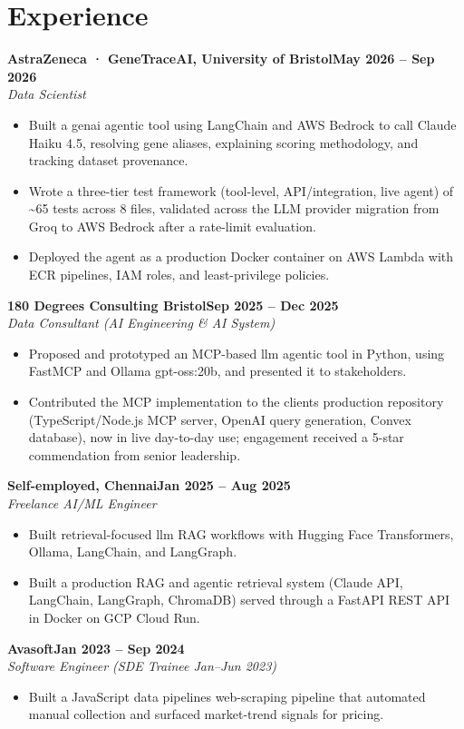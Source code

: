 \documentclass[a4paper,10pt]{article}
\newcommand{\entry}[4]{\noindent\textbf{#1}\hfill\textbf{#2}\\ \textit{#3}\hfill\textit{#4}\par}
\begin{document}
\section{Experience}
\entry{AstraZeneca · GeneTraceAI, University of Bristol}{May 2026 – Sep 2026}{Data Scientist}{}
\begin{itemize}
  \item Built a genai agentic tool using LangChain and AWS Bedrock to call Claude Haiku 4.5, resolving gene aliases, explaining scoring methodology, and tracking dataset provenance.
  \item Wrote a three-tier test framework (tool-level, API/integration, live agent) of \textasciitilde{}65 tests across 8 files, validated across the LLM provider migration from Groq to AWS Bedrock after a rate-limit evaluation.
  \item Deployed the agent as a production Docker container on AWS Lambda with ECR pipelines, IAM roles, and least-privilege policies.
\end{itemize}
\vspace{3pt}
\entry{180 Degrees Consulting Bristol}{Sep 2025 – Dec 2025}{Data Consultant (AI Engineering \& AI System)}{}
\begin{itemize}
  \item Proposed and prototyped an MCP-based llm agentic tool in Python, using FastMCP and Ollama gpt-oss:20b, and presented it to stakeholders.
  \item Contributed the MCP implementation to the client\textquotesingle{}s production repository (TypeScript/Node.js MCP server, OpenAI query generation, Convex database), now in live day-to-day use; engagement received a 5-star commendation from senior leadership.
\end{itemize}
\vspace{3pt}
\entry{Self-employed, Chennai}{Jan 2025 – Aug 2025}{Freelance AI/ML Engineer}{}
\begin{itemize}
  \item Built retrieval-focused llm RAG workflows with Hugging Face Transformers, Ollama, LangChain, and LangGraph.
  \item Built a production RAG and agentic retrieval system (Claude API, LangChain, LangGraph, ChromaDB) served through a FastAPI REST API in Docker on GCP Cloud Run.
\end{itemize}
\vspace{3pt}
\entry{Avasoft}{Jan 2023 – Sep 2024}{Software Engineer (SDE Trainee Jan–Jun 2023)}{}
\begin{itemize}
  \item Built a JavaScript data pipelines web-scraping pipeline that automated manual collection and surfaced market-trend signals for pricing.
\end{itemize}
\end{document}

